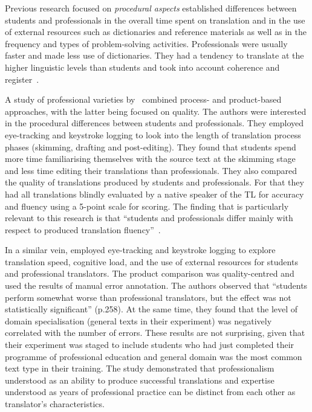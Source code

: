 Previous research focused on \textit{procedural aspects} established differences between students and professionals in the overall time spent on translation and in the use of external resources such as dictionaries and reference materials as well as in the frequency and types of problem-solving activities. Professionals were usually faster and made less use of dictionaries. They had a tendency to translate at the higher linguistic levels than students and took into account coherence and register~\cite{Tirkkonen1990}.  

A study of professional varieties by~\citet{Carl2010} combined process- and product-based approaches, with the latter being focused on quality. The authors were interested in the procedural differences between students and professionals. They employed eye-tracking and keystroke logging to look into the length of translation process phases (skimming, drafting and post-editing). They found that students spend more time familiarising themselves with the source text at the skimming stage and less time editing their translations than professionals. They also compared the quality of translations produced by students and professionals. For that they had all translations blindly evaluated by a native speaker of the TL for accuracy and fluency using a 5-point scale for scoring. The finding that is particularly relevant to this research is that ``students and professionals differ mainly with respect to produced translation fluency''~\cite{Carl2010}.

In a similar vein, \cite{Daems2017} employed eye-tracking and keystroke logging to explore translation speed, cognitive load, and the use of external resources for students and professional translators. The product comparison was quality-centred and used the results of manual error annotation. The authors observed that ``students perform somewhat worse than professional translators, but the effect was not statistically significant'' (p.258). At the same time, they found that the level of domain specialisation (general texts in their experiment) was negatively correlated with the number of errors. These results are not surprising, given that their experiment was staged to include students who had just completed their programme of professional education and general domain was the most common text type in their training. The study demonstrated that professionalism understood as an ability to produce successful translations and expertise understood as years of professional practice can be distinct from each other as translator's characteristics.

